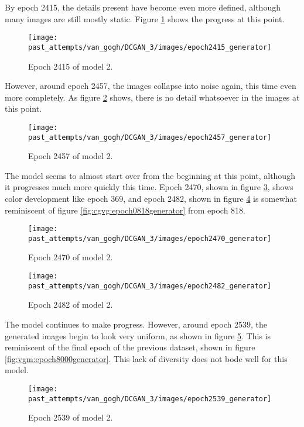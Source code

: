 \documentclass[11pt,letterpaper]{article}
\begin{document}
				By epoch 2415, the details present have become even more defined, although many images are still mostly static.
				Figure \ref{fig:cgvg:epoch2415generator} shows the progress at this point.
				\begin{figure}
					\centering
					\texttt{[image: past\_attempts/van\_gogh/DCGAN\_3/images/epoch2415\_generator]}
					\caption{Epoch 2415 of model 2.}
					\label{fig:cgvg:epoch2415generator}
				\end{figure}

				However, around epoch 2457, the images collapse into noise again, this time even more completely.
				As figure \ref{fig:cgvg:epoch2457generator} shows, there is no detail whatsoever in the images at this point.
				\begin{figure}
					\centering
					\texttt{[image: past\_attempts/van\_gogh/DCGAN\_3/images/epoch2457\_generator]}
					\caption{Epoch 2457 of model 2.}
					\label{fig:cgvg:epoch2457generator}
				\end{figure}

				The model seems to almost start over from the beginning at this point, although it progresses much more quickly this time.
				Epoch 2470, shown in figure \ref{fig:cgvg:epoch2470generator}, shows color development like epoch 369, and epoch 2482, shown in figure \ref{fig:cgvg:epoch2482generator} is somewhat reminiscent of figure \ref{fig:cgvg:epoch0818generator} from epoch 818.
				\begin{figure}
					\centering
					\texttt{[image: past\_attempts/van\_gogh/DCGAN\_3/images/epoch2470\_generator]}
					\caption{Epoch 2470 of model 2.}
					\label{fig:cgvg:epoch2470generator}
				\end{figure}

				\begin{figure}
					\centering
					\texttt{[image: past\_attempts/van\_gogh/DCGAN\_3/images/epoch2482\_generator]}
					\caption{Epoch 2482 of model 2.}
					\label{fig:cgvg:epoch2482generator}
				\end{figure}

				The model continues to make progress.
				However, around epoch 2539, the generated images begin to look very uniform, as shown in figure \ref{fig:cgvg:epoch2539generator}.
				This is reminiscent of the final epoch of the previous dataset, shown in figure \ref{fig:vgm:epoch8000generator}.
				This lack of diversity does not bode well for this model.
				\begin{figure}
					\centering
					\texttt{[image: past\_attempts/van\_gogh/DCGAN\_3/images/epoch2539\_generator]}
					\caption{Epoch 2539 of model 2.}
					\label{fig:cgvg:epoch2539generator}
				\end{figure}
\end{document}
